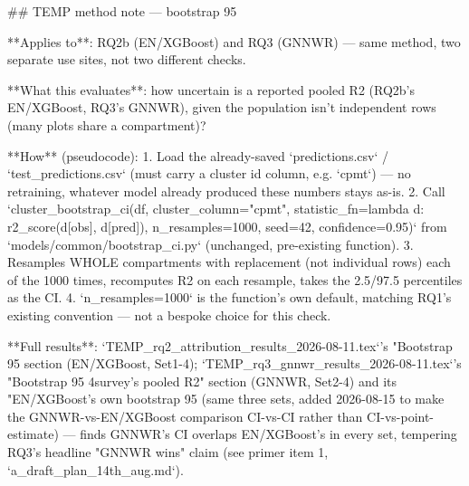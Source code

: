 ## TEMP method note — bootstrap 95%

**Applies to**: RQ2b (EN/XGBoost) and RQ3 (GNNWR) — same method, two separate use sites, not two
different checks.

**What this evaluates**: how uncertain is a reported pooled R2 (RQ2b's EN/XGBoost, RQ3's GNNWR),
given the population isn't independent rows (many plots share a compartment)?

**How** (pseudocode):
1. Load the already-saved `predictions.csv` / `test_predictions.csv` (must carry a cluster id
   column, e.g. `cpmt`) — no retraining, whatever model already produced these numbers stays as-is.
2. Call `cluster_bootstrap_ci(df, cluster_column="cpmt", statistic_fn=lambda d: r2_score(d[obs], d[pred]), n_resamples=1000, seed=42, confidence=0.95)`
   from `models/common/bootstrap_ci.py` (unchanged, pre-existing function).
3. Resamples WHOLE compartments with replacement (not individual rows) each of the 1000 times,
   recomputes R2 on each resample, takes the 2.5/97.5 percentiles as the CI.
4. `n_resamples=1000` is the function's own default, matching RQ1's existing convention — not a
   bespoke choice for this check.

**Full results**: `TEMP_rq2_attribution_results_2026-08-11.tex`'s "Bootstrap 95%
section (EN/XGBoost, Set1-4); `TEMP_rq3_gnnwr_results_2026-08-11.tex`'s "Bootstrap 95%
4survey's pooled R2" section (GNNWR, Set2-4) and its "EN/XGBoost's own bootstrap 95%
(same three sets, added 2026-08-15 to make the GNNWR-vs-EN/XGBoost comparison CI-vs-CI rather than
CI-vs-point-estimate) — finds GNNWR's CI overlaps EN/XGBoost's in every set, tempering RQ3's
headline "GNNWR wins" claim (see primer item 1, `a_draft_plan_14th_aug.md`).
